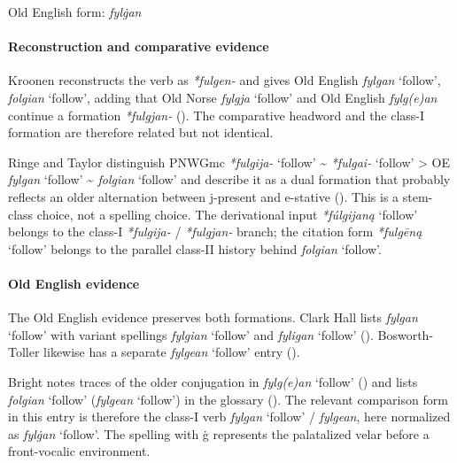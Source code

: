 \documentclass[
  british,
  a4paper,
]{article}
\providecommand{\Recon}[1]{\emph{*#1}}
\begin{document}
Old English form: \emph{fylġan}

\paragraph{Reconstruction and comparative
evidence}\label{reconstruction-and-comparative-evidence-97}

Kroonen reconstructs the verb as \emph{*fulgen-} and gives Old English
{\emph{fylgan}} `follow', {\emph{folgian}} `follow', adding that Old
Norse {\emph{fylgja}} `follow' and Old English {\emph{fylg(e)an}}
continue a formation \emph{*fulgjan-}
(). The comparative
headword and the class-I formation are therefore related but not
identical.

Ringe and Taylor distinguish PNWGmc \Recon{fulgija-} `follow'
\textasciitilde{} \Recon{fulgai-} `follow' \textgreater{} OE
{\emph{fylgan}} `follow' \textasciitilde{} {\emph{folgian}} `follow' and
describe it as a dual formation that probably reflects an older
alternation between j-present and e-stative
(). This
is a stem-class choice, not a spelling choice. The derivational input
\Recon{fúlgijaną} `follow' belongs to the class-I \emph{*fulgija-} /
\emph{*fulgjan-} branch; the citation form \Recon{fulgēną} `follow'
belongs to the parallel class-II history behind {\emph{folgian}}
`follow'.

\paragraph{Old English evidence}\label{old-english-evidence-99}

The Old English evidence preserves both formations. Clark Hall lists
{\emph{fylgan}} `follow' with variant spellings {\emph{fylgian}}
`follow' and {\emph{fyligan}} `follow'
(). Bosworth-Toller
likewise has a separate {\emph{fylgean}} `follow' entry
().

Bright notes traces of the older conjugation in {\emph{fylg(e)an}}
`follow' () and
lists {\emph{folgian}} `follow' ({\emph{fylgean}} `follow') in the
glossary ().
The relevant comparison form in this entry is therefore the class-I verb
{\emph{fylgan}} `follow' / {\emph{fylgean}}, here normalized as
{\emph{fylġan}} `follow'. The spelling with ġ represents the palatalized
velar before a front-vocalic environment.
\end{document}
